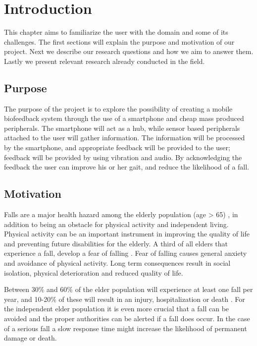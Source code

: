 \chapter{Introduction}
This chapter aims to familiarize the user with the domain and some of its challenges. The first sections will explain the purpose and motivation of our project. Next we describe our research questions and how we aim to answer them.  Lastly we present relevant research already conducted in the field.

\section{Purpose}
The purpose of the project is to explore the possibility of creating a mobile biofeedback system through the use of a smartphone and cheap mass produced peripherals. The smartphone will act as a hub, while sensor based peripherals attached to the user will gather information. The information will be processed by the smartphone, and appropriate feedback will be provided to the user; feedback will be provided by using vibration and audio. By acknowledging the feedback the user can improve his or her gait, and reduce the likelihood of a fall.

\section{Motivation}
Falls are a major health hazard among the elderly population (age \textgreater{} 65) \cite{fallsHealthHazard}, in addition to being an obstacle for physical activity and independent living. Physical activity can be an important instrument in improving the quality of life and preventing future disabilities for the elderly\cite{physicalActivity}. A third of all elders that experience a fall, develop a fear of falling \cite{fearOfFalling}. Fear of falling causes general anxiety and avoidance of physical activity. Long term consequences result in social isolation, physical deterioration and reduced quality of life.\cite{physicalAvoidance} %

Between 30\% and 60\% of the elder population will experience at least one fall per year, and 10-20\% of these will result in an injury, hospitalization or death \cite{fallStatistics}. For the independent elder population it is even more crucial that a fall can be avoided and the proper authorities can be alerted if a fall does occur. In the case of a serious fall a slow response time might increase the likelihood of permanent damage or death\cite{personHomeDeath, dangerousFallHome}.

